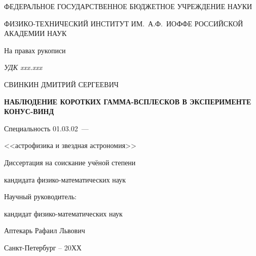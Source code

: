 \thispagestyle{empty}

\begin{center}
ФЕДЕРАЛЬНОЕ ГОСУДАРСТВЕННОЕ БЮДЖЕТНОЕ УЧРЕЖДЕНИЕ НАУКИ\par
ФИЗИКО-ТЕХНИЧЕСКИЙ ИНСТИТУТ ИМ.~А.Ф.~ИОФФЕ РОССИЙСКОЙ АКАДЕМИИ НАУК\par
\end{center}

\vspace{20mm}
\begin{flushright}
На правах рукописи

{\sl УДК xxx.xxx}
\end{flushright}

\vspace{30mm}
\begin{center}
{\large СВИНКИН ДМИТРИЙ СЕРГЕЕВИЧ}
\end{center}

\vspace{5mm}
\begin{center}
{\bf \large НАБЛЮДЕНИЕ КОРОТКИХ ГАММА-ВСПЛЕСКОВ В ЭКСПЕРИМЕНТЕ КОНУС-ВИНД
\par}

\vspace{10mm}
{%
Специальность 01.03.02~---

<<астрофизика и звездная астрономия>>
}

\vspace{10mm}
Диссертация на соискание учёной степени

кандидата физико-математических наук
\end{center}

\vspace{20mm}
\begin{flushright}
Научный руководитель:

кандидат физико-математических наук

Аптекарь Рафаил Львович

\end{flushright}

\vspace{20mm}
\begin{center}
{Санкт-Петербург -- 20ХХ}
\end{center}

\newpage